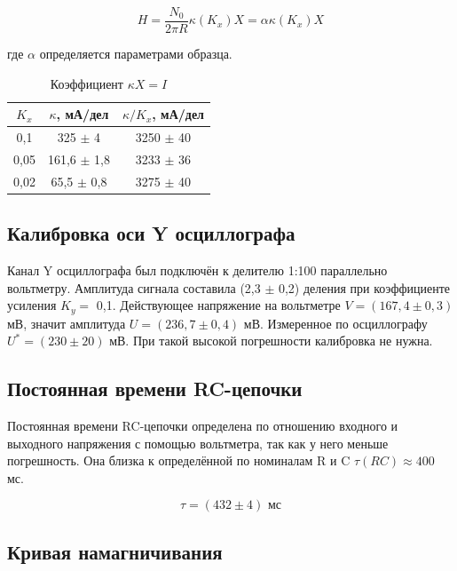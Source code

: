 \documentclass[12pt]{extarticle}
\begin{document}
		\begin{equation}
			H = \frac{N_0}{2\pi R} \kappa(K_x) X = \alpha \kappa (K_x) X
		\end{equation}
		
		где $\alpha$ определяется параметрами образца.
		
		\begin{table}
			\caption{Коэффициент $\kappa X = I$}
			\centering
			\begin{tabular}{|c|c|c|}
				\hline
				$K_x$ & $\kappa$, мА/дел & $\kappa / K_x$, мА/дел\\
				\hline
				0,1 &  325 $\pm$ 4 &  3250 $\pm$ 40  \\
				0,05 &  161,6 $\pm$ 1,8 &  3233 $\pm$ 36  \\
				0,02 &  65,5 $\pm$ 0,8  &  3275 $\pm$ 40 \\
				\hline
			\end{tabular}
		\end{table}
		
		\subsection{Калибровка оси Y осциллографа}
		
		\hspace{4mm} Канал Y осциллографа был подключён к делителю 1:100 параллельно вольтметру. Амплитуда сигнала составила (2,3 $\pm$ 0,2) деления при коэффициенте усиления $K_y =$ 0,1. Действующее напряжение на вольтметре $V = (167,4 \pm 0,3)$ мВ, значит амплитуда $U = (236,7 \pm 0,4)$ мВ. Измеренное по осциллографу $U^* = (230 \pm 20)$ мВ. При такой высокой погрешности калибровка не нужна.  
		
		
		\subsection{Постоянная времени RC-цепочки}
		
		\hspace{4mm} Постоянная времени RC-цепочки определена по отношению входного и выходного напряжения с помощью вольтметра, так как у него меньше погрешность. Она близка к определённой по номиналам R и C $\tau(RC) \approx 400$ мс.
		
		\begin{equation*}
			\tau = (432 \pm 4)\text{ мс}
		\end{equation*}
		
		\subsection{Кривая намагничивания}
		
\end{document}
